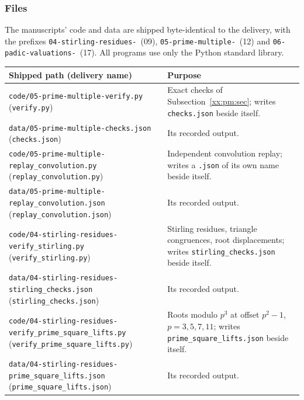 \documentclass[11pt,a4paper]{article}
\numberwithin{equation}{section}
\theoremstyle{definition}
\theoremstyle{remark}
\theoremstyle{plain}
\begin{document}
\subsubsection{Files}

The manuscripts' code and data are shipped byte-identical to the delivery,
with the prefixes \texttt{04-stirling-\allowbreak residues-}~(09),
\texttt{05-prime-\allowbreak multiple-}~(12) and
\texttt{06-padic-\allowbreak valuations-}~(17).  All programs use only the
Python standard library.
\begingroup
\renewcommand{\theHtable}{xx.lc.files}%
\begin{longtable}{@{}>{\raggedright\arraybackslash}p{}>{\raggedright\arraybackslash}p{}@{}}
\toprule
Shipped path (delivery name) & Purpose\\
\midrule
\endhead
\texttt{code/05-prime-\allowbreak multiple-\allowbreak verify.py} (\texttt{verify.py}) & Exact checks of Subsection~\ref{xx:pm:sec}; writes \texttt{checks.json} beside itself.\\
\texttt{data/05-prime-\allowbreak multiple-\allowbreak checks.json} (\texttt{checks.json}) & Its recorded output.\\
\texttt{code/05-prime-\allowbreak multiple-\allowbreak replay\_convolution.py} (\texttt{replay\_\allowbreak convolution.py}) & Independent convolution replay; writes a \texttt{.json} of its own name beside itself.\\
\texttt{data/05-prime-\allowbreak multiple-\allowbreak replay\_convolution.json} (\texttt{replay\_\allowbreak convolution.json}) & Its recorded output.\\
\texttt{code/04-stirling-\allowbreak residues-\allowbreak verify\_stirling.py} (\texttt{verify\_\allowbreak stirling.py}) & Stirling residues, triangle congruences, root displacements; writes \texttt{stirling\_\allowbreak checks.json} beside itself.\\
\texttt{data/04-stirling-\allowbreak residues-\allowbreak stirling\_checks.json} (\texttt{stirling\_\allowbreak checks.json}) & Its recorded output.\\
\texttt{code/04-stirling-\allowbreak residues-\allowbreak verify\_prime\_square\_lifts.py} (\texttt{verify\_\allowbreak prime\_\allowbreak square\_\allowbreak lifts.py}) & Roots modulo $p^3$ at offset $p^2-1$, $p=3,5,7,11$; writes \texttt{prime\_\allowbreak square\_\allowbreak lifts.json} beside itself.\\
\texttt{data/04-stirling-\allowbreak residues-\allowbreak prime\_square\_lifts.json} (\texttt{prime\_\allowbreak square\_\allowbreak lifts.json}) & Its recorded output.\\

\end{longtable}
\end{document}
